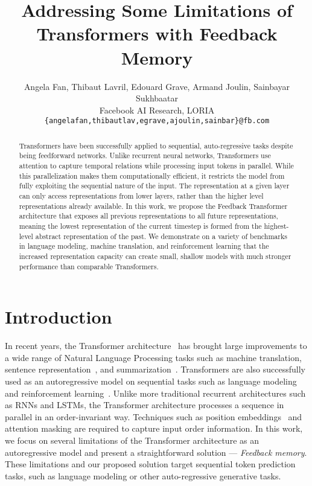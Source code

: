\documentclass{article} \usepackage{iclr2021_conference}
\title{Addressing Some Limitations of Transformers with Feedback Memory}
\author{Angela Fan, Thibaut Lavril, Edouard Grave, Armand Joulin, Sainbayar Sukhbaatar \\ 
Facebook AI Research, LORIA\\
\texttt{\{angelafan,thibautlav,egrave,ajoulin,sainbar\}@fb.com}
}
\begin{document}
\maketitle
\lhead{}

\begin{abstract}
Transformers have been successfully applied to sequential, auto-regressive tasks despite being feedforward networks.
Unlike recurrent neural networks, Transformers use attention to capture temporal relations while processing input tokens in parallel.
While this parallelization makes them computationally efficient, 
it restricts the model from fully exploiting the sequential nature of the input.
The representation at a given layer can only access representations from lower layers, rather than the higher level representations already available.
In this work, we propose the Feedback Transformer architecture that exposes all previous representations to all future representations, meaning the lowest representation of the current timestep is formed from the highest-level abstract representation of the past.
We demonstrate on a variety of benchmarks in language modeling, machine translation, and reinforcement learning that the increased representation capacity can create small, shallow models with much stronger performance than comparable Transformers. 

\end{abstract}

\section{Introduction}

In recent years, the Transformer architecture~\citep{vaswani2017attention} has brought large improvements to a wide range of Natural Language Processing tasks such as machine translation, sentence representation~\citep{devlin2018bert}, and summarization~\citep{edunov2019pre}. 
Transformers are also successfully used as an autoregressive model on sequential tasks such as language modeling~\citep{dai2019transformer,rae2020compressive} and reinforcement learning~\citep{Parisotto2019StabilizingTF}.
Unlike more traditional recurrent architectures such as RNNs and LSTMs, the Transformer architecture processes a sequence in parallel in an order-invariant way.
Techniques such as position embeddings~\citep{sukhbaatar2015end,shaw2018self} and attention masking are required to capture  input order information. In this work, we focus on several limitations of the Transformer architecture as an autoregressive model and present a straightforward solution --- \textit{Feedback memory}.  These limitations and our proposed solution target sequential token prediction tasks, such as language modeling or other auto-regressive generative tasks.
\end{document}
